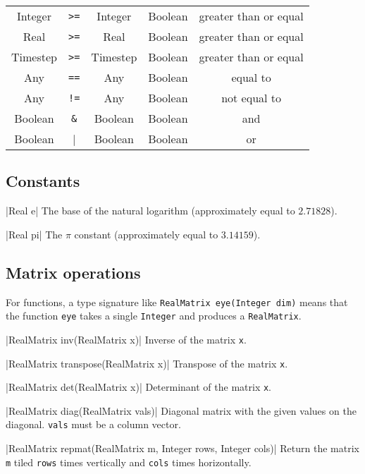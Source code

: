\begin{table}[H]
\begin{tabular}{ c c c c c }
Integer & \verb|>=| & Integer & Boolean & greater than or equal \\
Real & \verb|>=| & Real & Boolean & greater than or equal \\
Timestep & \verb|>=| & Timestep & Boolean & greater than or equal \\

Any & \verb|==| & Any & Boolean & equal to \\

Any & \verb|!=| & Any & Boolean & not equal to \\

Boolean & \verb|&| & Boolean & Boolean & and \\

Boolean & \verb||| & Boolean & Boolean & or \\

\bottomrule
\end{tabular}
\end{table}


\subsection{Constants}
\label{sec:builtin-constants}

\blog|Real e|
\myindent The base of the natural logarithm (approximately equal to $2.71828$).

\blog|Real pi|
\myindent The $\pi$ constant (approximately equal to $3.14159$).


\subsection{Matrix operations}
\label{sec:builtin-matrix-ops}

For functions, a type signature like \verb|RealMatrix eye(Integer dim)| means
that the function \verb|eye| takes a single \verb|Integer| and produces a
\verb|RealMatrix|.

\blog|RealMatrix inv(RealMatrix x)|
\myindent Inverse of the matrix \verb|x|.

\blog|RealMatrix transpose(RealMatrix x)|
\myindent Transpose of the matrix \verb|x|.

\blog|RealMatrix det(RealMatrix x)|
\myindent Determinant of the matrix \verb|x|.

\blog|RealMatrix diag(RealMatrix vals)|
\myindent Diagonal matrix with the given values on the diagonal. \verb|vals|
must be a
column vector.

\blog|RealMatrix repmat(RealMatrix m, Integer rows, Integer cols)|
\myindent Return the matrix \verb|m| tiled \verb|rows| times vertically and
\verb|cols|
times horizontally.

